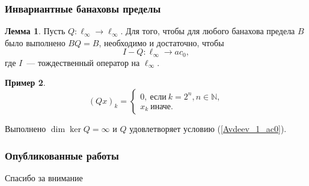 \documentclass[10pt,pdf,hyperref={unicode},aspectratio=169]{beamer}
\theoremstyle{definition}
\newtheorem{llemma}{Лемма}
\newtheorem{eexample}[llemma]{Пример}
\begin{document}
\begin{frame}
	\frametitle{Инвариантные банаховы пределы~\cite{our-ped-2018-inf-dim-ker}}
	\begin{llemma}
		Пусть $Q:\ell_\infty \to \ell_\infty$.
		Для того, чтобы для любого банахова предела $B$
		было выполнено $BQ = B$,
		необходимо и достаточно, чтобы
		\begin{equation}\label{Avdeev_1_ac0}
			I-Q : \ell_\infty \to ac_0,
		\end{equation}
		где $I$~--- тождественный оператор на $\ell_\infty$.
	\end{llemma}

	\begin{eexample}
		\begin{equation*}
			(Qx)_k =
			\begin{cases}
				0,~\mbox{если}~ k = 2^n, n \in\mathbb{N},
				\\
				x_k~\mbox{иначе.}
			\end{cases}
		\end{equation*}

		Выполнено $\dim \ker Q = \infty$ и $Q$ удовлетворяет условию (\ref{Avdeev_1_ac0}).
	\end{eexample}


\end{frame}


\begin{frame}
	\frametitle{Опубликованные работы}
	\printbibliography{}
\end{frame}


\begin{frame}
	\huge\centering
	Спасибо за внимание
\end{frame}


\end{document}
